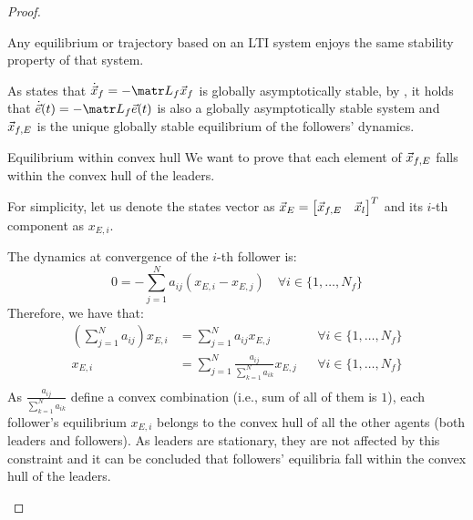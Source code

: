 \begin{theorem}
\begin{proof}
\begin{descriptionlist}
                \begin{lemma} \label{th:lti_stability_equilib_traj}
                    Any equilibrium or trajectory based on an LTI system enjoys the same stability property of that system.
                \end{lemma}

                As  states that $\dot{\x}_f = -\lap_f \x_f$ is globally asymptotically stable, by , it holds that $\dot{\vec{e}}(t) = -\lap_f \vec{e}(t)$ is also a globally asymptotically stable system and ${\vec{x}}_{f,E}$ is the unique globally stable equilibrium of the followers' dynamics.

            \item[Equilibrium within convex hull] 
                We want to prove that each element of ${\vec{x}}_{f,E}$ falls within the convex hull of the leaders.

                For simplicity, let us denote the states vector as ${\vec{x}}_E = \begin{bmatrix} {\vec{x}}_{f,E} & {\vec{x}}_l \end{bmatrix}^T$ and its $i$-th component as $x_{E,i}$.

                The dynamics at convergence of the $i$-th follower is:
                \[ 0 = - \sum_{j=1}^N a_{ij} (x_{E,i} - x_{E,j}) \quad \forall i \in \{ 1, \dots, N_f \} \]
                Therefore, we have that:
                \[
                    \begin{aligned}
                        \left( \sum_{j=1}^N a_{ij} \right) x_{E,i} &= \sum_{j=1}^N a_{ij} x_{E,j} & & \forall i \in \{ 1, \dots, N_f \} \\
                        x_{E,i} &= \sum_{j=1}^N \frac{a_{ij}}{\sum_{k=1}^N a_{ik}} x_{E,j} & & \forall i \in \{ 1, \dots, N_f \} \\
                    \end{aligned}
                \]
                As $\frac{a_{ij}}{\sum_{k=1}^N a_{ik}}$ define a convex combination (i.e., sum of all of them is $1$), each follower's equilibrium $x_{E,i}$ belongs to the convex hull of all the other agents (both leaders and followers). As leaders are stationary, they are not affected by this constraint and it can be concluded that followers' equilibria fall within the convex hull of the leaders.
        \end{descriptionlist}
    \end{proof}
\end{theorem}

